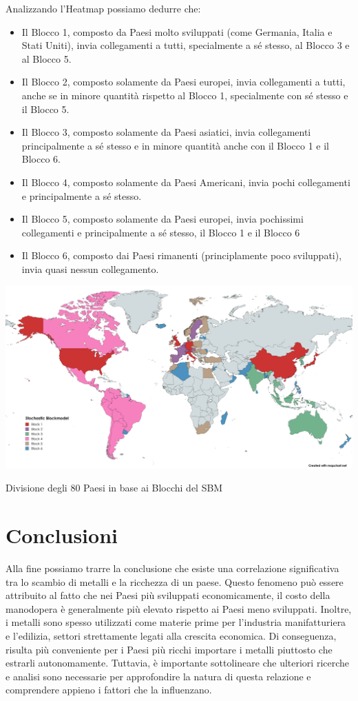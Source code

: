 \documentclass[11pt]{article}
\providecommand{\tightlist}{%
      \setlength{\itemsep}{0pt}\setlength{\parskip}{0pt}}
\begin{document}
    Analizzando l'Heatmap possiamo dedurre che:

\begin{itemize}
\tightlist
\item
  Il Blocco 1, composto da Paesi molto sviluppati (come Germania, Italia
  e Stati Uniti), invia collegamenti a tutti, specialmente a sé stesso,
  al Blocco 3 e al Blocco 5.
\item
  Il Blocco 2, composto solamente da Paesi europei, invia collegamenti a
  tutti, anche se in minore quantità rispetto al Blocco 1, specialmente
  con sé stesso e il Blocco 5.
\item
  Il Blocco 3, composto solamente da Paesi asiatici, invia collegamenti
  principalmente a sé stesso e in minore quantità anche con il Blocco 1
  e il Blocco 6.
\item
  Il Blocco 4, composto solamente da Paesi Americani, invia pochi
  collegamenti e principalmente a sé stesso.
\item
  Il Blocco 5, composto solamente da Paesi europei, invia pochissimi
  collegamenti e principalmente a sé stesso, il Blocco 1 e il Blocco 6
\item
  Il Blocco 6, composto dai Paesi rimanenti (principlamente poco
  sviluppati), invia quasi nessun collegamento.
\end{itemize}

    \includegraphics{imagesWorldMaps/Stochastic_Blockmodel.png}

Divisione degli 80 Paesi in base ai Blocchi del SBM

    \section{Conclusioni}\label{conclusioni}

    Alla fine possiamo trarre la conclusione che esiste una correlazione
significativa tra lo scambio di metalli e la ricchezza di un paese.
Questo fenomeno può essere attribuito al fatto che nei Paesi più
sviluppati economicamente, il costo della manodopera è generalmente più
elevato rispetto ai Paesi meno sviluppati. Inoltre, i metalli sono
spesso utilizzati come materie prime per l'industria manifatturiera e
l'edilizia, settori strettamente legati alla crescita economica. Di
conseguenza, risulta più conveniente per i Paesi più ricchi importare i
metalli piuttosto che estrarli autonomamente. Tuttavia, è importante
sottolineare che ulteriori ricerche e analisi sono necessarie per
approfondire la natura di questa relazione e comprendere appieno i
fattori che la influenzano.


    
    
    
\end{document}
